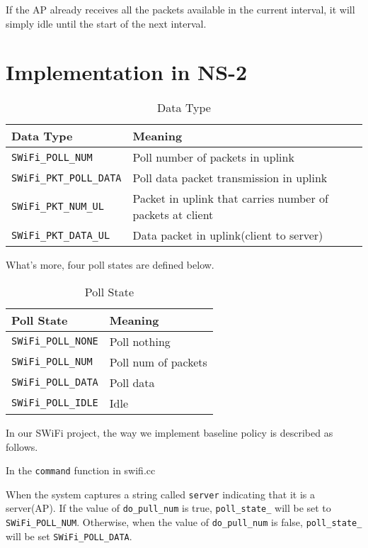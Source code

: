 \documentclass{article}
\begin{document}
If the AP already receives all the packets available in the current interval, it will simply idle until the start of the next interval.

     

\section{Implementation in NS-2}
\label{section: ns2}
\begin{table}[htbp]
   \centering
   \caption{Data Type}
   \label{tab:table3}
   \begin{tabular}{| l | l |}
      \hline
      Data Type  &  Meaning\\ \hline
      \lstinline|SWiFi_POLL_NUM| & Poll number of packets in uplink\\ \hline 
      \lstinline|SWiFi_PKT_POLL_DATA|  & Poll data packet transmission in uplink\\ \hline 
      \lstinline|SWiFi_PKT_NUM_UL| & Packet in uplink that carries number of packets at client\\ \hline 
      \lstinline|SWiFi_PKT_DATA_UL| & Data packet in uplink(client to server)\\  
     \hline
   \end{tabular}
\end{table}
 
What's more, four poll states are defined below. 
\begin{table}[htbp]
   \centering
   \caption{Poll State}
   \label{tab:table4}
   \begin{tabular}{| l | l |}
      \hline
      Poll State  &  Meaning\\ \hline
      \lstinline|SWiFi_POLL_NONE| & Poll nothing\\ \hline 
      \lstinline|SWiFi_POLL_NUM|  & Poll num of packets\\ \hline 
      \lstinline|SWiFi_POLL_DATA| & Poll data\\ \hline 
      \lstinline|SWiFi_POLL_IDLE| & Idle\\  
     \hline
   \end{tabular}
\end{table}
In our SWiFi project, the way we implement baseline policy is described as follows. 

In the \lstinline|command| function in swifi.cc

When the system captures a string called  \lstinline|server| indicating that it is a server(AP). If the value of  \lstinline|do_pull_num|  is true,  \lstinline|poll_state_|  will be set to  \lstinline|SWiFi_POLL_NUM|. Otherwise, when the value of  \lstinline|do_pull_num|  is false,   \lstinline|poll_state_|  will be set  \lstinline|SWiFi_POLL_DATA|. 
\end{document}
